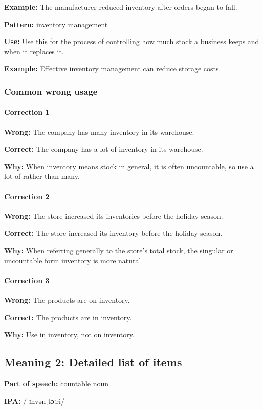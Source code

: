 \documentclass[11pt]{article}
\begin{document}
\textbf{Example:} The manufacturer reduced inventory after orders began to fall.

\textbf{Pattern:} inventory management

\textbf{Use:} Use this for the process of controlling how much stock a business keeps and when it replaces it.

\textbf{Example:} Effective inventory management can reduce storage costs.

\subsubsection{Common wrong usage}
\paragraph{Correction 1}
\textbf{Wrong:} The company has many inventory in its warehouse.

\textbf{Correct:} The company has a lot of inventory in its warehouse.

\textbf{Why:} When inventory means stock in general, it is often uncountable, so use a lot of rather than many.

\paragraph{Correction 2}
\textbf{Wrong:} The store increased its inventories before the holiday season.

\textbf{Correct:} The store increased its inventory before the holiday season.

\textbf{Why:} When referring generally to the store's total stock, the singular or uncountable form inventory is more natural.

\paragraph{Correction 3}
\textbf{Wrong:} The products are on inventory.

\textbf{Correct:} The products are in inventory.

\textbf{Why:} Use in inventory, not on inventory.

\subsection{Meaning 2: Detailed list of items}
\textbf{Part of speech:} countable noun

\textbf{IPA:} /ˈɪnvənˌtɔːri/
\end{document}
